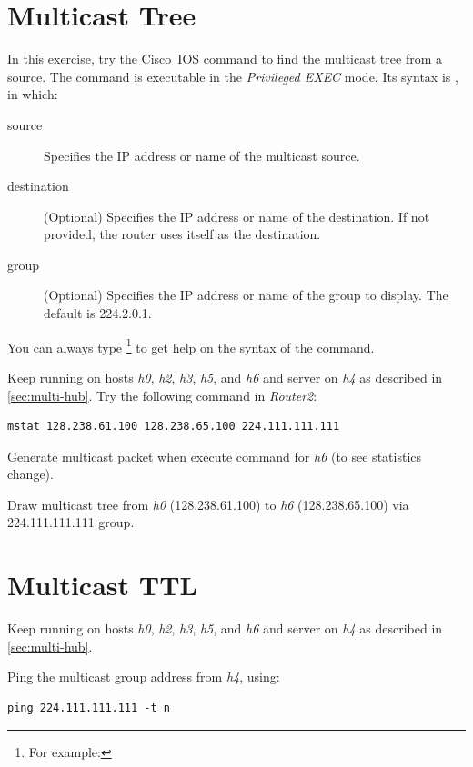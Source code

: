\documentclass{../UTNetLab}
\begin{document}
\section{Multicast Tree}
In this exercise, try the  Cisco~IOS command to find the multicast tree from a source.
The  command is executable in the \textit{Privileged EXEC} mode.
Its syntax is , in which:
\begin{description}
    \item[source] Specifies the IP address or name of the multicast source.
    \item[destination] (Optional) Specifies the IP address or name of the destination. If not provided, the router uses itself as the destination.
    \item[group] (Optional) Specifies the IP address or name of the group to display. The default is 224.2.0.1.
\end{description}
You can always type \footnote{For example: } to get help on the syntax of the command.

Keep  running on hosts \textit{h0}, \textit{h2}, \textit{h3}, \textit{h5}, and \textit{h6} and server on \textit{h4} as described in \autoref{sec:multi-hub}.
Try the following command in \textit{Router2}:

\begin{lstlisting}[language={cisco}]
mstat 128.238.61.100 128.238.65.100 224.111.111.111
\end{lstlisting}

Generate multicast packet when execute command for \textit{h6} (to see statistics change).

\begin{report}
    \item Draw multicast tree from \textit{h0} (128.238.61.100) to \textit{h6} (128.238.65.100) via 224.111.111.111 group.
\end{report}

\section{Multicast TTL}
Keep  running on hosts \textit{h0}, \textit{h2}, \textit{h3}, \textit{h5}, and \textit{h6} and server on \textit{h4} as described in \autoref{sec:multi-hub}.

Ping the multicast group address from \textit{h4}, using:
\begin{lstlisting}[emph={n}]
ping 224.111.111.111 -t n
\end{lstlisting}
\end{document}

